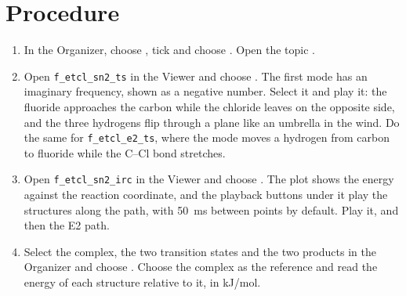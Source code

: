 \section{Procedure}
\begin{enumerate}
	\item In the Organizer, choose , tick  and choose . Open the topic .
	\item Open \texttt{f\_etcl\_sn2\_ts} in the Viewer and choose . The first mode has an imaginary frequency, shown as a negative number. Select it and play it: the fluoride approaches the carbon while the chloride leaves on the opposite side, and the three hydrogens flip through a plane like an umbrella in the wind. Do the same for \texttt{f\_etcl\_e2\_ts}, where the mode moves a hydrogen from carbon to fluoride while the C--Cl bond stretches.
	\item Open \texttt{f\_etcl\_sn2\_irc} in the Viewer and choose . The plot shows the energy against the reaction coordinate, and the playback buttons under it play the structures along the path, with 50~ms between points by default. Play it, and then the E2 path.
	\item Select the complex, the two transition states and the two products in the Organizer and choose . Choose the complex as the reference and read the energy of each structure relative to it, in kJ/mol.
\end{enumerate}

